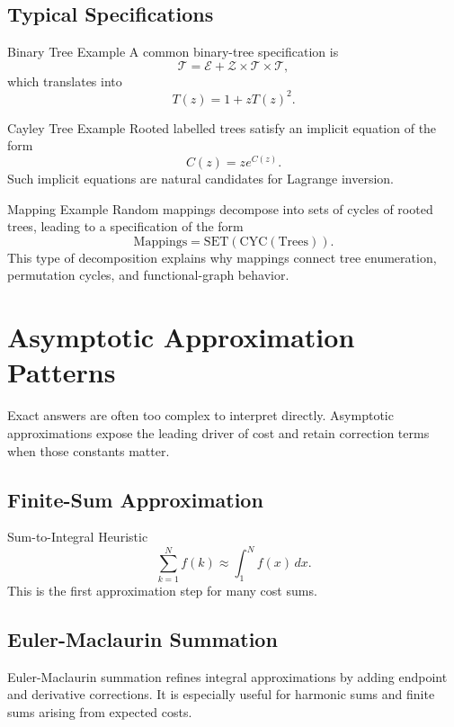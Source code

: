 \documentclass[11pt]{article}
\begin{document}
\subsection{Typical Specifications}

\begin{mathbox}{Binary Tree Example}
A common binary-tree specification is
\[
\mathcal{T}=\mathcal{E}+\mathcal{Z}\times\mathcal{T}\times\mathcal{T},
\]
which translates into
\[
T(z)=1+zT(z)^2.
\]
\end{mathbox}

\begin{mathbox}{Cayley Tree Example}
Rooted labelled trees satisfy an implicit equation of the form
\[
C(z)=ze^{C(z)}.
\]
Such implicit equations are natural candidates for Lagrange inversion.
\end{mathbox}

\begin{mathbox}{Mapping Example}
Random mappings decompose into sets of cycles of rooted trees, leading to a specification of the form
\[
\mathrm{Mappings}=\mathrm{SET}(\mathrm{CYC}(\mathrm{Trees})).
\]
This type of decomposition explains why mappings connect tree enumeration, permutation cycles, and functional-graph behavior.
\end{mathbox}

\section{Asymptotic Approximation Patterns}

Exact answers are often too complex to interpret directly. Asymptotic approximations expose the leading driver of cost and retain correction terms when those constants matter.

\subsection{Finite-Sum Approximation}

\begin{mathbox}{Sum-to-Integral Heuristic}
\[
\sum_{k=1}^{N} f(k) \approx \int_1^N f(x)\,dx.
\]
This is the first approximation step for many cost sums.
\end{mathbox}

\subsection{Euler-Maclaurin Summation}

Euler-Maclaurin summation refines integral approximations by adding endpoint and derivative corrections. It is especially useful for harmonic sums and finite sums arising from expected costs.
\end{document}

